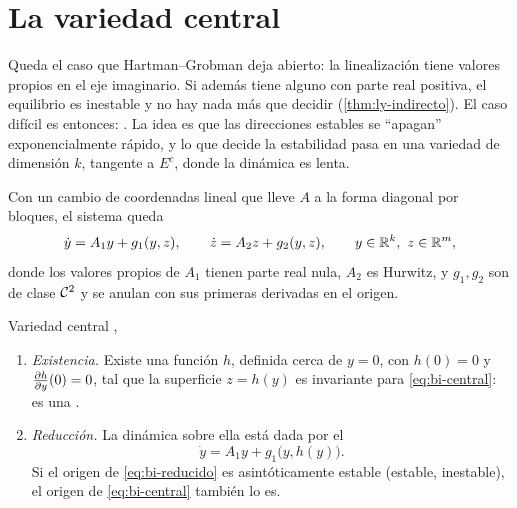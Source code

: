 \section{La variedad central}
\label{sec:bi-central}

Queda el caso que Hartman--Grobman deja abierto: la linealización tiene valores propios en el eje imaginario. Si además tiene alguno con parte real positiva, el equilibrio es inestable y no hay nada más que decidir (\cref{thm:ly-indirecto}). El caso difícil es entonces: . La idea es que las direcciones estables se ``apagan'' exponencialmente rápido, y lo que decide la estabilidad pasa en una variedad de dimensión $k$, tangente a $E^c$, donde la dinámica es lenta.

Con un cambio de coordenadas lineal que lleve $A$ a la forma diagonal por bloques, el sistema queda
\begin{equation}
  \dot y=A_1y+g_1(y,z),\qquad \dot z=A_2z+g_2(y,z),\qquad y\in\mathbb{R}^k,\ z\in\mathbb{R}^m,
  \label{eq:bi-central}
\end{equation}
donde los valores propios de $A_1$ tienen parte real nula, $A_2$ es Hurwitz, y $g_1,g_2$ son de clase $\mathcal{C}^{2}$ y se anulan con sus primeras derivadas en el origen.

\begin{teorema}[label=thm:bi-central]{Variedad central \citep[Teoremas~8.1 y~8.2]{Kha02}, \citep[Teoremas~1 y~2]{Car81}}
\begin{enumerate}
  \item \emph{Existencia.} Existe una función $h$, definida cerca de $y=0$, con $h(0)=0$ y $\frac{\partial h}{\partial y}(0)=0$, tal que la superficie $z=h(y)$ es invariante para \eqref{eq:bi-central}: es una .
  \item \emph{Reducción.} La dinámica sobre ella está dada por el 
  \begin{equation}
    \dot y=A_1y+g_1\bigl(y,h(y)\bigr) .
    \label{eq:bi-reducido}
  \end{equation}
  Si el origen de \eqref{eq:bi-reducido} es asintóticamente estable (estable, inestable), el origen de \eqref{eq:bi-central} también lo es.
\end{enumerate}
\end{teorema}



